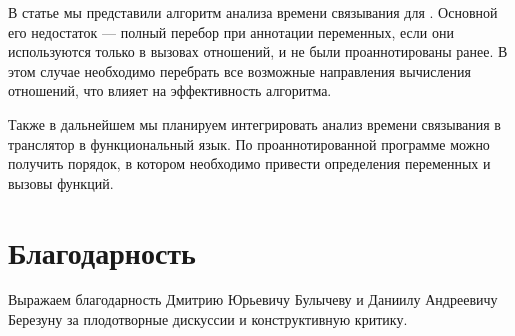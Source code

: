 \documentclass[conference,american,russian]{IEEEtran}
\begin{document}
В статье мы представили алгоритм анализа времени связывания для \miniKanren{}. Основной его недостаток --- полный перебор при аннотации переменных, если они используются только в вызовах отношений, и не были проаннотированы ранее. В этом случае необходимо перебрать все возможные направления вычисления отношений, что влияет на эффективность алгоритма.

Также в дальнейшем мы планируем интегрировать анализ времени связывания в транслятор в функциональный язык. По проаннотированной программе можно получить порядок, в котором необходимо привести определения переменных и вызовы функций.

\section*{Благодарность}

Выражаем благодарность Дмитрию Юрьевичу Булычеву и Даниилу Андреевичу Березуну за плодотворные дискуссии и конструктивную критику.



\end{document}
